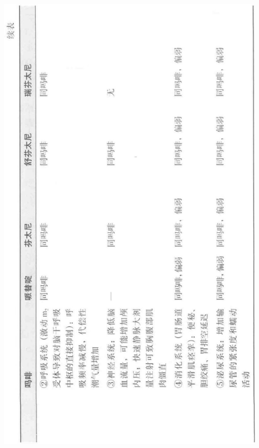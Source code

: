\documentclass[10pt]{article}
\begin{document}
\begin{center}
\includegraphics[max width=\textwidth]{2024_07_05_645bb794a4d4f32ee0c8g-331}
\end{center}
\end{document}
